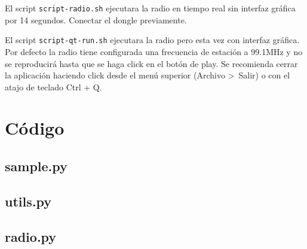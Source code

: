 El script \texttt{script-radio.sh} ejecutara la radio en tiempo real sin interfaz gráfica por 14 segundos. Conectar el dongle previamente.

El script \texttt{script-qt-run.sh} ejecutara la radio pero esta vez con interfaz gráfica. Por defecto la radio tiene configurada una frecuencia de estación a 99.1MHz y no se reproducirá hasta que se haga click en el botón de play.
Se recomienda cerrar la aplicación haciendo click desde el menú superior (Archivo \textgreater\ Salir) o con el atajo de teclado Ctrl + Q.  

\newpage

\section{Código}

\subsection{sample.py}\label{ap:sample.py}


\newpage

\subsection{utils.py}\label{ap:utils.py}


\newpage

\subsection{radio.py}\label{ap:radio.py}
